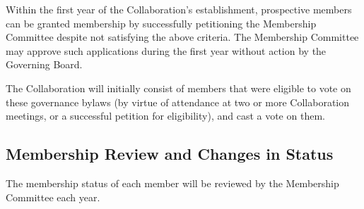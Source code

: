 \documentclass[12pt]{article}
\begin{document}
Within the first year of the Collaboration's establishment, prospective members can be granted membership by successfully petitioning the Membership Committee despite not satisfying the above criteria.  The Membership Committee may approve such applications during the first year without action by the Governing Board.  

The Collaboration will initially consist of members that were eligible to vote on these governance bylaws (by virtue of attendance at two or more Collaboration meetings, or a successful petition for eligibility), and cast a vote on them. 

\subsection{Membership Review and Changes in Status}
The membership status of each member will be reviewed by the Membership Committee each year. 
\end{document}
